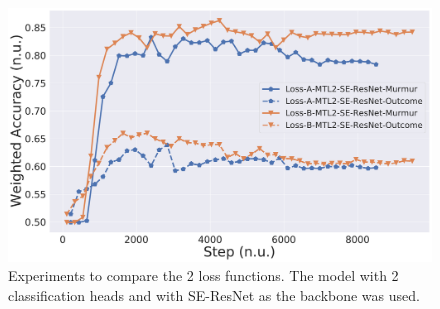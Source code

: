 

\begin{figure}[!htp]
\centering
\includegraphics[width=\linewidth]{images/clf-se-resnet-lossA-vs-lossB.pdf}
\caption[]
{Experiments to compare the 2 loss functions. The model with 2 classification heads and with SE-ResNet as the backbone was used.}
\label{fig:clf-se-resnet-lossA-vs-lossB}
\end{figure}
